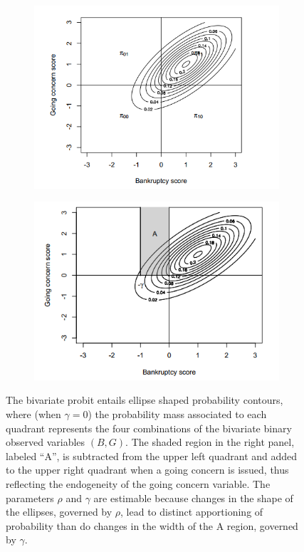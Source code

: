 \documentclass[aoas,preprint, 11pt, dvipsnames, table, x11name]{imsart}
\theoremstyle{remark}
\begin{document}
	\begin{figure}[h]
		\centering
		\begin{subfigure}{.4\textwidth}
			\includegraphics[scale=0.44]{ellipse1}
		\end{subfigure}
		\begin{subfigure}{.4\textwidth}
			\includegraphics[scale=0.515]{ellipse2}
		\end{subfigure}
		\caption{The bivariate probit entails ellipse shaped probability contours, where (when $\gamma=0$) the probability mass associated to each quadrant represents the four combinations of the bivariate binary observed variables $(B, G)$. The shaded region in the right panel, labeled ``A'', is subtracted from the upper left quadrant and added to the upper right quadrant when a going concern is issued, thus reflecting the endogeneity of the going concern variable. The parameters $\rho$ and $\gamma$ are estimable because changes in the shape of the ellipses, governed by $\rho$, lead to distinct apportioning of probability than do changes in the width of the A region, governed by $\gamma$.}
		\label{ellipse}
	\end{figure}
	
\end{document}
